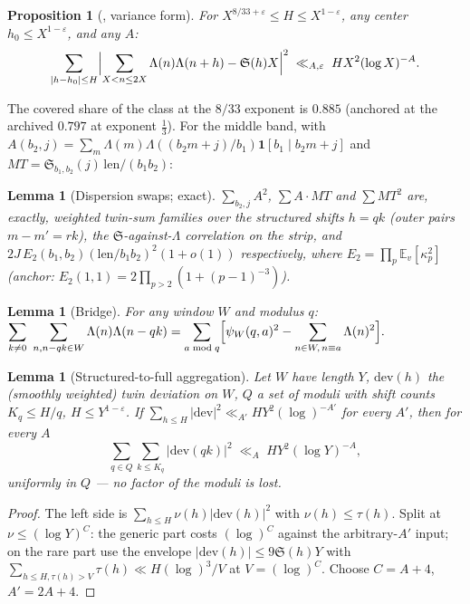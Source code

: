 \documentclass[11pt]{article}
\numberwithin{equation}{section}
\newtheorem{lemma}[theorem]{Lemma}
\newtheorem{proposition}[theorem]{Proposition}
\theoremstyle{definition}
\theoremstyle{remark}
\newcommand{\LL}{\Lambda}
\newcommand{\SSS}{\mathfrak{S}}
\begin{document}
\begin{proposition}[{\cite[Thm.~1.3(i)]{MRT}}, variance
form]\label{p:IM}
For $X^{8/33+\varepsilon}\le H\le X^{1-\varepsilon}$, any center
$h_0\le X^{1-\varepsilon}$, and any $A$:
\[
\sum_{|h-h_0|\le H}\Bigl|\sum_{X<n\le2X}\LL(n)\LL(n+h)-\SSS(h)X
\Bigr|^2\;\ll_{A,\varepsilon}\;HX^2(\log X)^{-A}.
\]
\end{proposition}

\noindent The covered share of the class at the $8/33$ exponent
is $0.885$ (anchored at the archived $0.797$ at exponent
$\tfrac13$). For the middle band, with
$A(b_2,j)=\sum_m\LL(m)\LL((b_2m+j)/b_1)\mathbf1[b_1\mid b_2m+j]$
and $MT=\SSS_{b_1,b_2}(j)\,\mathrm{len}/(b_1b_2)$:

\begin{lemma}[Dispersion swaps; exact]\label{l:swaps}
$\sum_{b_2,j}A^2$, $\sum A\cdot MT$ and $\sum MT^2$ are, exactly,
weighted twin-sum families over the structured shifts $h=qk$
(outer pairs $m-m'=rk$), the $\SSS$-against-$\LL$ correlation on
the strip, and $2J\,E_2(b_1,b_2)(\mathrm{len}/b_1b_2)^2(1+o(1))$
respectively, where $E_2=\prod_p\mathbb E_v[\kappa_p^2]$ (anchor:
$E_2(1,1)=2\prod_{p>2}(1+(p-1)^{-3})$).
\end{lemma}

\begin{lemma}[Bridge]\label{l:bridge}
For any window $W$ and modulus $q$:
$\displaystyle\sum_{k\ne0}\ \sum_{n,n-qk\in W}\LL(n)\LL(n-qk)
=\sum_{a\bmod q}\Bigl[\psi_W(q,a)^2-\sum_{n\in W,\,n\equiv a}
\LL(n)^2\Bigr].$
\end{lemma}

\begin{lemma}[Structured-to-full aggregation]\label{l:U}
Let $W$ have length $Y$, $\mathrm{dev}(h)$ the (smoothly
weighted) twin deviation on $W$, $Q$ a set of moduli with shift
counts $K_q\le H/q$, $H\le Y^{1-\varepsilon}$. If
$\sum_{h\le H}|\mathrm{dev}|^2\ll_{A'}HY^2(\log)^{-A'}$ for every
$A'$, then for every $A$
\[
\sum_{q\in Q}\sum_{k\le K_q}|\mathrm{dev}(qk)|^2
\;\ll_A\;HY^2(\log Y)^{-A},
\]
uniformly in $Q$ --- no factor of the moduli is lost.
\end{lemma}

\begin{proof}
The left side is $\sum_{h\le H}\nu(h)|\mathrm{dev}(h)|^2$ with
$\nu(h)\le\tau(h)$. Split at $\nu\le(\log Y)^{C}$: the generic
part costs $(\log)^{C}$ against the arbitrary-$A'$ input; on the
rare part use the envelope $|\mathrm{dev}(h)|\le9\SSS(h)Y$ with
$\sum_{h\le H,\tau(h)>V}\tau(h)\ll H(\log)^3/V$ at
$V=(\log)^{C}$. Choose $C=A+4$, $A'=2A+4$.
\end{proof}
\end{document}
